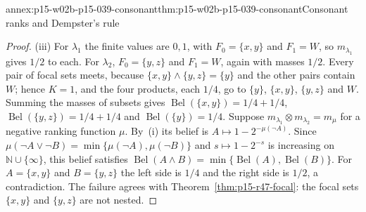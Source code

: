 \begin{annexitem}{annex:p15-w02b-p15-039-consonant}{thm:p15-w02b-p15-039-consonant}{Consonant ranks and Dempster's rule}
\begin{proof}
(iii) For \(\lambda_1\) the finite values are \(0,1\), with
\(F_0=\{x,y\}\) and \(F_1=W\), so \(m_{\lambda_1}\) gives \(1/2\) to each.
For \(\lambda_2\), \(F_0=\{y,z\}\) and \(F_1=W\), again with masses
\(1/2\).  Every pair of focal sets meets, because
\(\{x,y\}\land\{y,z\}=\{y\}\) and the other pairs contain \(W\); hence
\(K=1\), and the four products, each \(1/4\), go to \(\{y\}\),
\(\{x,y\}\), \(\{y,z\}\) and \(W\).  Summing the masses of subsets gives
\(\operatorname{Bel}(\{x,y\})=1/4+1/4\),
\(\operatorname{Bel}(\{y,z\})=1/4+1/4\) and
\(\operatorname{Bel}(\{y\})=1/4\).  Suppose
\(m_{\lambda_1}\otimes m_{\lambda_2}=m_\mu\) for a negative ranking
function \(\mu\).  By~(i) its belief is
\(A\mapsto1-2^{-\mu(\neg A)}\).  Since
\(\mu(\neg A\lor\neg B)=\min\{\mu(\neg A),\mu(\neg B)\}\) and
\(s\mapsto1-2^{-s}\) is increasing on \(\mathbb N\cup\{\infty\}\), this belief
satisfies \(\operatorname{Bel}(A\land B)=\min\{\operatorname{Bel}(A),\operatorname{Bel}(B)\}\).
For \(A=\{x,y\}\) and \(B=\{y,z\}\) the left side is \(1/4\) and the right
side is \(1/2\), a contradiction.  The failure agrees with
Theorem~\ref{thm:p15-r47-focal}: the focal sets \(\{x,y\}\) and
\(\{y,z\}\) are not nested.
\end{proof}
\end{annexitem}
